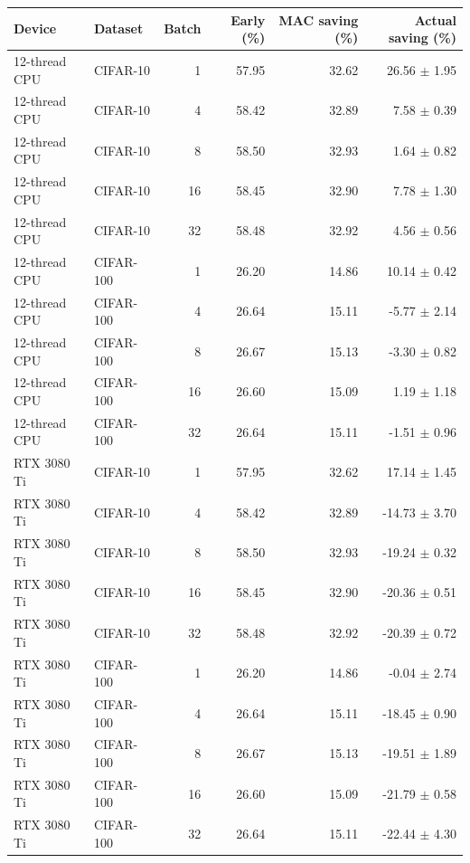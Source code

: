 \begin{tabular}{llrrrr}
\toprule
Device & Dataset & Batch & Early (\%) & MAC saving (\%) & Actual saving (\%) \\
\midrule
12-thread CPU & CIFAR-10 & 1 & 57.95 & 32.62 & 26.56 $\pm$ 1.95 \\
12-thread CPU & CIFAR-10 & 4 & 58.42 & 32.89 & 7.58 $\pm$ 0.39 \\
12-thread CPU & CIFAR-10 & 8 & 58.50 & 32.93 & 1.64 $\pm$ 0.82 \\
12-thread CPU & CIFAR-10 & 16 & 58.45 & 32.90 & 7.78 $\pm$ 1.30 \\
12-thread CPU & CIFAR-10 & 32 & 58.48 & 32.92 & 4.56 $\pm$ 0.56 \\
12-thread CPU & CIFAR-100 & 1 & 26.20 & 14.86 & 10.14 $\pm$ 0.42 \\
12-thread CPU & CIFAR-100 & 4 & 26.64 & 15.11 & -5.77 $\pm$ 2.14 \\
12-thread CPU & CIFAR-100 & 8 & 26.67 & 15.13 & -3.30 $\pm$ 0.82 \\
12-thread CPU & CIFAR-100 & 16 & 26.60 & 15.09 & 1.19 $\pm$ 1.18 \\
12-thread CPU & CIFAR-100 & 32 & 26.64 & 15.11 & -1.51 $\pm$ 0.96 \\
RTX 3080 Ti & CIFAR-10 & 1 & 57.95 & 32.62 & 17.14 $\pm$ 1.45 \\
RTX 3080 Ti & CIFAR-10 & 4 & 58.42 & 32.89 & -14.73 $\pm$ 3.70 \\
RTX 3080 Ti & CIFAR-10 & 8 & 58.50 & 32.93 & -19.24 $\pm$ 0.32 \\
RTX 3080 Ti & CIFAR-10 & 16 & 58.45 & 32.90 & -20.36 $\pm$ 0.51 \\
RTX 3080 Ti & CIFAR-10 & 32 & 58.48 & 32.92 & -20.39 $\pm$ 0.72 \\
RTX 3080 Ti & CIFAR-100 & 1 & 26.20 & 14.86 & -0.04 $\pm$ 2.74 \\
RTX 3080 Ti & CIFAR-100 & 4 & 26.64 & 15.11 & -18.45 $\pm$ 0.90 \\
RTX 3080 Ti & CIFAR-100 & 8 & 26.67 & 15.13 & -19.51 $\pm$ 1.89 \\
RTX 3080 Ti & CIFAR-100 & 16 & 26.60 & 15.09 & -21.79 $\pm$ 0.58 \\
RTX 3080 Ti & CIFAR-100 & 32 & 26.64 & 15.11 & -22.44 $\pm$ 4.30 \\
\bottomrule
\end{tabular}
